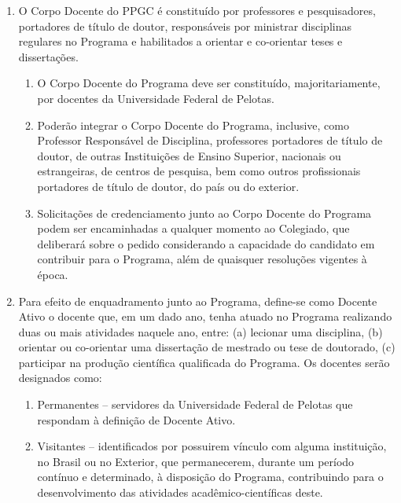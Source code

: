 \documentclass{article}
\begin{document}
\begin{enumerate}
	\item O Corpo Docente do PPGC é constituído por professores e pesquisadores, portadores de título de doutor, responsáveis por ministrar disciplinas regulares no Programa e habilitados a orientar e co-orientar teses e dissertações.

	\begin{enumerate}
		\item O Corpo Docente do Programa deve ser constituído, majoritariamente, por docentes da Universidade Federal de Pelotas.

		\item Poderão integrar o Corpo Docente do Programa, inclusive, como Professor Responsável de Disciplina, professores portadores de título de doutor, de outras Instituições de Ensino Superior, nacionais ou estrangeiras, de centros de pesquisa, bem como outros profissionais portadores de título de doutor, do país ou do exterior.

		\item Solicitações de credenciamento junto ao Corpo Docente do Programa podem ser encaminhadas a qualquer momento ao Colegiado, que deliberará sobre o pedido considerando a capacidade do candidato em contribuir para o Programa, além de quaisquer resoluções vigentes à época.
	\end{enumerate}

	\item Para efeito de enquadramento junto ao Programa, define-se como Docente Ativo o docente que, em um dado ano, tenha atuado no Programa realizando duas ou mais atividades naquele ano, entre: (a) lecionar uma disciplina, (b) orientar ou co-orientar uma dissertação de mestrado ou tese de doutorado, (c) participar na produção científica qualificada do Programa. Os docentes serão designados como:

	\begin{enumerate}[label=\Roman*]

		\item Permanentes – servidores da Universidade Federal de Pelotas que respondam à definição de Docente Ativo.

		\item Visitantes – identificados por possuirem vínculo com alguma instituição, no Brasil ou no Exterior, que permanecerem, durante um período contínuo e determinado, à disposição do Programa, contribuindo para o desenvolvimento das atividades acadêmico-científicas deste.		


\end{enumerate}
\end{enumerate}
\end{document}
